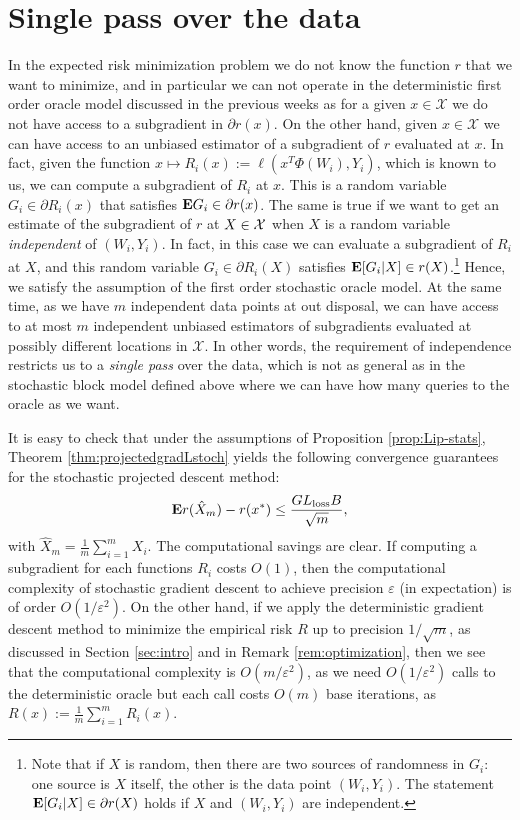 \section{Single pass over the data}
In the expected risk minimization problem we do not know the function $r$ that we want to minimize, and in particular we can not operate in the deterministic first order oracle model discussed in the previous weeks as for a given $x\in\mathcal{X}$ we do not have access to a subgradient in $\partial r(x)$. On the other hand, given $x\in\mathcal{X}$ we can have access to an unbiased estimator of a subgradient of $r$ evaluated at $x$. In fact, given the function $x \mapsto R_i(x) := \ell(x^T\Phi(W_i),Y_i)$, which is known to us, we can compute a subgradient of $R_i$ at $x$. This is a random variable $G_i\in \partial R_i(x)$ that satisfies $\mathbf{E} G_i \in \partial r(x)$. The same is true if we want to get an estimate of the subgradient of $r$ at $X\in\mathcal{X}$ when $X$ is a random variable \emph{independent} of $(W_i,Y_i)$. In fact, in this case we can evaluate a subgradient of $R_i$ at $X$, and this random variable $G_i\in \partial R_i(X)$ satisfies $\mathbf{E}[G_i|X]\in r(X)$.\footnote{Note that if $X$ is random, then there are two sources of randomness in $G_i$: one source is $X$ itself, the other is the data point $(W_i,Y_i)$. The statement $\mathbf{E}[G_i|X]\in \partial r(X)$ holds if $X$ and $(W_i,Y_i)$ are independent.} Hence, we satisfy the assumption of the first order stochastic oracle model. At the same time, as we have $m$ independent data points at out disposal, we can have access to at most $m$ independent unbiased estimators of subgradients evaluated at possibly different locations in $\mathcal{X}$. In other words, the requirement of independence restricts us to a \emph{single pass} over the data, which is not as general as in the stochastic block model defined above where we can have how many queries to the oracle as we want.

It is easy to check that under the assumptions of Proposition \ref{prop:Lip-stats}, Theorem \ref{thm:projectedgradLstoch} yields the following convergence guarantees for the stochastic projected descent method:
$$
	\mathbf{E} r(\hat X_m) - r(x^*) \leq \frac{GL_\textrm{loss}B}{\sqrt{m}},
$$
with $\hat X_m = \frac{1}{m}\sum_{i=1}^m X_i$. The computational savings are clear. If computing a subgradient for each functions $R_i$ costs $O(1)$, then the computational complexity of stochastic gradient descent to achieve precision $\varepsilon$ (in expectation) is of order $O(1/\varepsilon^2)$. On the other hand, if we apply the deterministic gradient descent method to minimize the empirical risk $R$ up to precision $1/\sqrt{m}$, as discussed in Section \ref{sec:intro} and in Remark \ref{rem:optimization}, then we see that the computational complexity is $O(m/\varepsilon^2)$, as we need $O(1/\varepsilon^2)$ calls to the deterministic oracle but each call costs $O(m)$ base iterations, as $R(x) := \frac{1}{m} \sum_{i=1}^m R_i(x)$.


